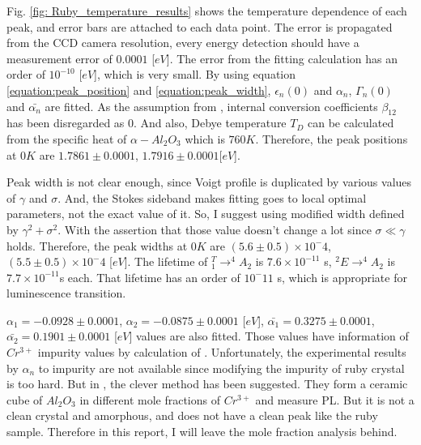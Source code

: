 \documentclass{article}
\begin{document}
Fig. \ref{fig: Ruby_temperature_results} shows the temperature dependence of each peak, and error bars are attached to each data point.
The error is propagated from the CCD camera resolution, every energy detection should have a measurement error of $0.0001$ [$eV$].
The error from the fitting calculation has an order of $10^{-10}$ [$eV$], which is very small.
By using equation \ref{equation:peak_position} and \ref{equation:peak_width}, $\epsilon_n(0)$ and $\alpha_n$, $\Gamma_n(0)$ and $\bar{\alpha_n}$ are fitted.
As the assumption from \cite{Ruby_temp_theoretical}, internal conversion coefficients $\beta_{12}$ has been disregarded as 0.
And also, Debye temperature $T_D$ can be calculated from the specific heat of $\alpha-Al_2 O_3 $ which is $760 K$.
Therefore, the peak positions at 0$K$ are $1.7861 \pm 0.0001$, $1.7916 \pm 0.0001$[$eV$].


Peak width is not clear enough, since Voigt profile is duplicated by various values of $\gamma$ and $\sigma$.
And, the Stokes sideband makes fitting goes to local optimal parameters, not the exact value of it.
So, I suggest using modified width defined by $\gamma^2 + \sigma^2$.
With the assertion that those value doesn't change a lot since $\sigma \ll \gamma$ holds.
Therefore, the peak widths at 0$K$ are $(5.6 \pm 0.5)\times 10^-4$, $(5.5 \pm 0.5)\times 10^-4$ [$eV$].
The lifetime of $^T_1 \rightarrow ^4A_2$ is $7.6 \times 10^{-11}$ s, $ ^2E \rightarrow ^4A_2$ is $7.7 \times 10^{-11}$s each.
That lifetime has an order of $10^-{11}$ s, which is appropriate for luminescence transition.

$\alpha_1 = -0.0928 \pm 0.0001$, $\alpha_2 = -0.0875 \pm 0.0001$ [$eV$], $\bar{\alpha_1} = 0.3275 \pm 0.0001$, $\bar{\alpha_2} = 0.1901 \pm 0.0001$ [$eV$] values are also fitted.
Those values have information of $Cr^{3+}$ impurity values by calculation of \cite{fitting_coef_impurity}.
Unfortunately, the experimental results by $\alpha_n$ to impurity are not available since modifying the impurity of ruby crystal is too hard.
But in \cite{doping_ratio}, the clever method has been suggested.
They form a ceramic cube of $Al_2 O_3$ in different mole fractions of $Cr^{3+}$ and measure PL.
But it is not a clean crystal and amorphous, and does not have a clean peak like the ruby sample.
Therefore in this report, I will leave the mole fraction analysis behind.
\end{document}
